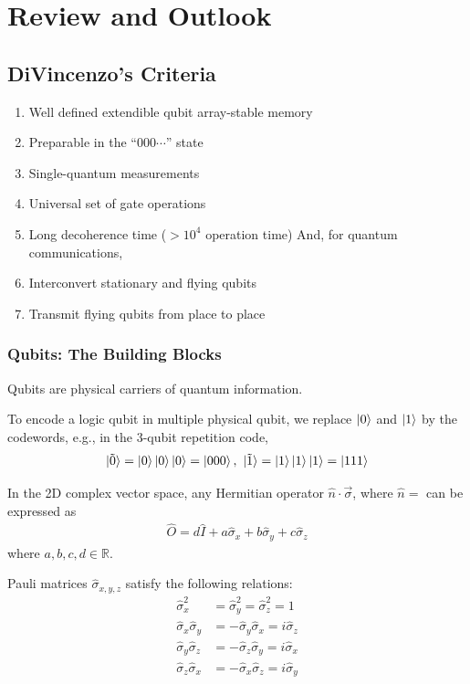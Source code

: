 \newpage
\section{Review and Outlook}
\subsection{DiVincenzo's Criteria}
\begin{enumerate}
    \item Well defined extendible qubit array-stable memory
    \item Preparable in the ``$000\cdots$'' state
    \item Single-quantum measurements
    \item Universal set of gate operations
    \item Long decoherence time ($> 10^4$ operation time)
    \subitem And, for quantum communications,
    \item Interconvert stationary and flying qubits
    \item Transmit flying qubits from place to place
\end{enumerate}

\subsubsection{Qubits: The Building Blocks}
Qubits are physical carriers of quantum information. 

To encode a logic qubit in multiple physical qubit, we replace $\ket{0}$ and $\ket{1}$ by the codewords, e.g., in the 3-qubit repetition code,
\begin{align*}
    \ket{\tilde{0}}=\ket{0}\ket{0}\ket{0}=\ket{000},\ \ket{\tilde{1}}=\ket{1}\ket{1}\ket{1}=\ket{111}
\end{align*}

In the 2D complex vector space, any Hermitian operator $\hat{n}\cdot \vec{\sigma}$, where $\hat{n}=$ can be expressed as 
\begin{align*}
    \hat{O}=d\hat{I}+a\hat{\sigma}_x+b\hat{\sigma}_y+c\hat{\sigma}_z
\end{align*}
where $a,b,c,d\in\mathbb{R}$. 

Pauli matrices $\hat{\sigma}_{x,y,z}$ satisfy the following relations:
\begin{align*}
    \hat{\sigma}_x^2&=\hat{\sigma}_y^2=\hat{\sigma}_z^2=1\\
    \hat{\sigma}_x\hat{\sigma}_y&=-\hat{\sigma}_y\hat{\sigma}_x=i\hat{\sigma}_z\\
    \hat{\sigma}_y\hat{\sigma}_z&=-\hat{\sigma}_z\hat{\sigma}_y=i\hat{\sigma}_x\\
    \hat{\sigma}_z\hat{\sigma}_x&=-\hat{\sigma}_x\hat{\sigma}_z=i\hat{\sigma}_y
\end{align*}

